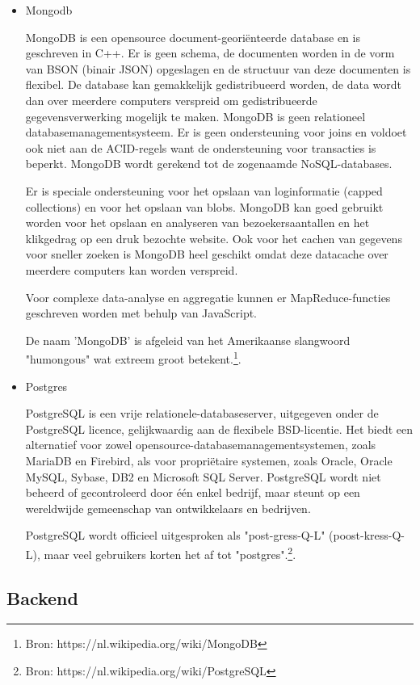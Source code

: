 \documentclass[11pt,twoside,a4paper]{article}
\begin{document}
	\begin{itemize}
	\item Mongodb
	
MongoDB is een opensource document-georiënteerde database en is geschreven in C++. Er is geen schema, de documenten worden in de vorm van BSON (binair JSON) opgeslagen en de structuur van deze documenten is flexibel. De database kan gemakkelijk gedistribueerd worden, de data wordt dan over meerdere computers verspreid om gedistribueerde gegevensverwerking mogelijk te maken. MongoDB is geen relationeel databasemanagementsysteem. Er is geen ondersteuning voor joins en voldoet ook niet aan de ACID-regels want de ondersteuning voor transacties is beperkt. MongoDB wordt gerekend tot de zogenaamde NoSQL-databases.

Er is speciale ondersteuning voor het opslaan van loginformatie (capped collections) en voor het opslaan van blobs. MongoDB kan goed gebruikt worden voor het opslaan en analyseren van bezoekersaantallen en het klikgedrag op een druk bezochte website. Ook voor het cachen van gegevens voor sneller zoeken is MongoDB heel geschikt omdat deze datacache over meerdere computers kan worden verspreid.

Voor complexe data-analyse en aggregatie kunnen er MapReduce-functies geschreven worden met behulp van JavaScript.

De naam 'MongoDB' is afgeleid van het Amerikaanse slangwoord "humongous" wat extreem groot betekent.\footnote{Bron: https://nl.wikipedia.org/wiki/MongoDB}. 	
	
	\item Postgres
	
PostgreSQL is een vrije relationele-databaseserver, uitgegeven onder de PostgreSQL licence, gelijkwaardig aan de flexibele BSD-licentie. Het biedt een alternatief voor zowel opensource-databasemanagementsystemen, zoals MariaDB en Firebird, als voor propri\"etaire systemen, zoals Oracle, Oracle MySQL, Sybase, DB2 en Microsoft SQL Server. PostgreSQL wordt niet beheerd of gecontroleerd door \'e\'en enkel bedrijf, maar steunt op een wereldwijde gemeenschap van ontwikkelaars en bedrijven.

PostgreSQL wordt officieel uitgesproken als "post-gress-Q-L" (poost-kress-Q-L), maar veel gebruikers korten het af tot "postgres".\footnote{Bron: https://nl.wikipedia.org/wiki/PostgreSQL}. 		
	
	\end{itemize}
	
	\subsection{Backend}
	
\end{document}
